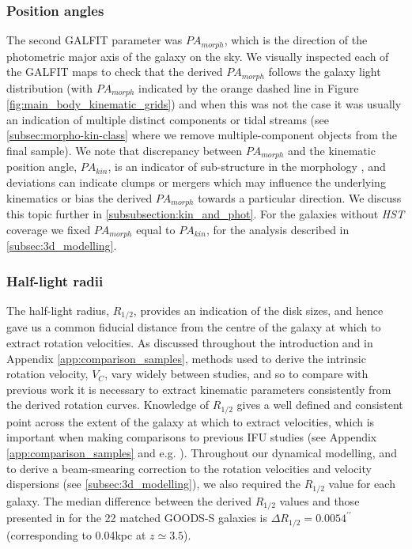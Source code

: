 \documentclass[fleqn,usenatbib]{mnras}
\begin{document}
\subsubsection{Position angles}\label{subsubsection:position_angle}
The second {\scriptsize GALFIT} parameter was $PA_{morph}$, which is the direction of the photometric major axis of the galaxy on the sky.
We visually inspected each of the {\scriptsize GALFIT} maps to check that the derived $PA_{morph}$ follows the galaxy light distribution (with $PA_{morph}$ indicated by the orange dashed line in Figure \ref{fig:main_body_kinematic_grids}) and when this was not the case it was usually an indication of multiple distinct components or tidal streams (see \cref{subsec:morpho-kin-class} where we remove multiple-component objects from the final sample).
We note that discrepancy between $PA_{morph}$ and the kinematic position angle, $PA_{kin}$, is an indicator of sub-structure in the morphology \citep[e.g.][]{Queyrel2012,Wisnioski2015,Rodrigues2017}, and deviations can indicate clumps or mergers which may influence the underlying kinematics or bias the derived $PA_{morph}$ towards a particular direction.
We discuss this topic further in \cref{subsubsection:kin_and_phot}.
For the galaxies without {\em HST} coverage we fixed $PA_{morph}$ equal to $PA_{kin}$, for the analysis described in \cref{subsec:3d_modelling}.


\subsubsection{Half-light radii}\label{subsubsection:half-light_radii}
The half-light radius, $R_{1/2}$, provides an indication of the disk sizes, and hence gave us a common fiducial distance from the centre of the galaxy at which to extract rotation velocities.
As discussed throughout the introduction and in Appendix \ref{app:comparison_samples}, methods used to derive the intrinsic rotation velocity, $V_{C}$, vary widely between studies, and so to compare with previous work it is necessary to extract kinematic parameters consistently from the derived rotation curves.
Knowledge of $R_{1/2}$ gives a well defined and consistent point across the extent of the galaxy at which to extract velocities, which is important when making comparisons to previous IFU studies (see Appendix \ref{app:comparison_samples} and e.g. \citealt{ForsterSchreiber2009,Epinat2012,Wisnioski2015,Stott2016,Harrison2017,Swinbank2017}).
Throughout our dynamical modelling, and to derive a beam-smearing correction to the rotation velocities and velocity dispersions (see \cref{subsec:3d_modelling}), we also required the $R_{1/2}$ value for each galaxy.
The median difference between the derived $R_{1/2}$ values and those presented in \cite{VanderWel2012} for the 22 matched GOODS-S galaxies is $\Delta R_{1/2} = 0.0054^{\prime\prime}$ (corresponding to 0.04kpc at $z\simeq3.5$). \\
\end{document}
